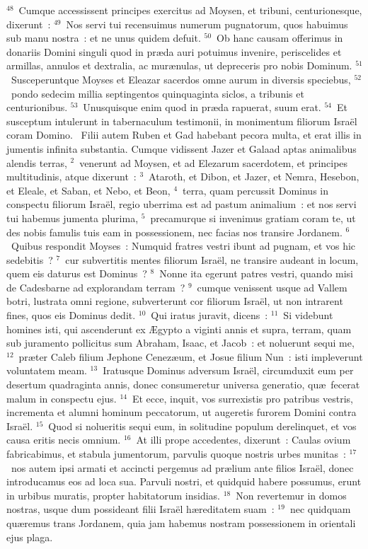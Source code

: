 ${}^{48}$~Cumque accessissent principes exercitus ad Moysen, et tribuni, centurionesque, dixerunt~:
${}^{49}$~Nos servi tui recensuimus numerum pugnatorum, quos habuimus sub manu nostra~: et ne unus quidem defuit.
${}^{50}$~Ob hanc causam offerimus in donariis Domini singuli quod in pr\ae da auri potuimus invenire, periscelides et armillas, annulos et dextralia, ac mur\ae nulas, ut depreceris pro nobis Dominum.
${}^{51}$~Susceperuntque Moyses et Eleazar sacerdos omne aurum in diversis speciebus,
${}^{52}$~pondo sedecim millia septingentos quinquaginta siclos, a tribunis et centurionibus.
${}^{53}$~Unusquisque enim quod in pr\ae da rapuerat, suum erat.
${}^{54}$~Et susceptum intulerunt in tabernaculum testimonii, in monimentum filiorum Isra\"el coram Domino.
~Filii autem Ruben et Gad habebant pecora multa, et erat illis in jumentis infinita substantia. Cumque vidissent Jazer et Galaad aptas animalibus alendis terras,
${}^{2}$~venerunt ad Moysen, et ad Elezarum sacerdotem, et principes multitudinis, atque dixerunt~:
${}^{3}$~Ataroth, et Dibon, et Jazer, et Nemra, Hesebon, et Eleale, et Saban, et Nebo, et Beon,
${}^{4}$~terra, quam percussit Dominus in conspectu filiorum Isra\"el, regio uberrima est ad pastum animalium~: et nos servi tui habemus jumenta plurima,
${}^{5}$~precamurque si invenimus gratiam coram te, ut des nobis famulis tuis eam in possessionem, nec facias nos transire Jordanem.
${}^{6}$~Quibus respondit Moyses~: Numquid fratres vestri ibunt ad pugnam, et vos hic sedebitis~?
${}^{7}$~cur subvertitis mentes filiorum Isra\"el, ne transire audeant in locum, quem eis daturus est Dominus~?
${}^{8}$~Nonne ita egerunt patres vestri, quando misi de Cadesbarne ad explorandam terram~?
${}^{9}$~cumque venissent usque ad Vallem botri, lustrata omni regione, subverterunt cor filiorum Isra\"el, ut non intrarent fines, quos eis Dominus dedit.
${}^{10}$~Qui iratus juravit, dicens~:
${}^{11}$~Si videbunt homines isti, qui ascenderunt ex \AE gypto a viginti annis et supra, terram, quam sub juramento pollicitus sum Abraham, Isaac, et Jacob~: et noluerunt sequi me,
${}^{12}$~pr\ae ter Caleb filium Jephone Cenez\ae um, et Josue filium Nun~: isti impleverunt voluntatem meam.
${}^{13}$~Iratusque Dominus adversum Isra\"el, circumduxit eum per desertum quadraginta annis, donec consumeretur universa generatio, qu\ae\ fecerat malum in conspectu ejus.
${}^{14}$~Et ecce, inquit, vos surrexistis pro patribus vestris, incrementa et alumni hominum peccatorum, ut augeretis furorem Domini contra Isra\"el.
${}^{15}$~Quod si nolueritis sequi eum, in solitudine populum derelinquet, et vos causa eritis necis omnium.
${}^{16}$~At illi prope accedentes, dixerunt~: Caulas ovium fabricabimus, et stabula jumentorum, parvulis quoque nostris urbes munitas~:
${}^{17}$~nos autem ipsi armati et accincti pergemus ad pr\ae lium ante filios Isra\"el, donec introducamus eos ad loca sua. Parvuli nostri, et quidquid habere possumus, erunt in urbibus muratis, propter habitatorum insidias.
${}^{18}$~Non revertemur in domos nostras, usque dum possideant filii Isra\"el h\ae reditatem suam~:
${}^{19}$~nec quidquam qu\ae remus trans Jordanem, quia jam habemus nostram possessionem in orientali ejus plaga.


